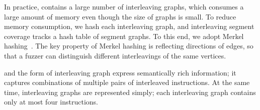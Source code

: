 In practice, \intcov contains a large number of interleaving graphs,
which consumes a large amount of memory even though the size of graphs
is small.
%
To reduce memory consumption, we hash each interleaving graph,
and interleaving segment coverage tracks a hash table of segment
graphs.
%
To this end, we adopt Merkel hashing~\cite{treehashing, treehashing2}.
%
The key property of Merkel hashing is reflecting directions of edges,
so that a fuzzer can distinguish different interleavings of the same
vertices.
%








%
%
\Intcov and the form of interleaving graph express semantically rich
information; it captures combinations of multiple pairs of interleaved
instructions. At the same time, interleaving graphs are represented
simply; each interleaving graph contains only at most four
instructions.

